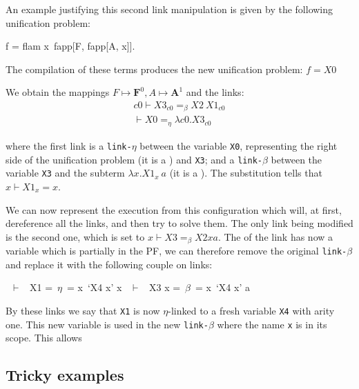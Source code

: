 \documentclass[sigconf,natbib=false,review]{acmart}
\newcommand{\linkbeta}{\texttt{link-}\ensuremath{\beta}\xspace}
\newcommand{\linketa}{\texttt{link-}\ensuremath{\eta}\xspace}
\newcommand{\linketaM}[3]{\ensuremath{#1 \vdash #2 =_\eta #3}}
\newcommand{\linkbetaM}[3]{\ensuremath{#1 \vdash #2 =_\beta #3}}
\newcommand{\substCell}[3]{\ensuremath{#1 \vdash #2 = #3}}
\newcommand{\mapping}[3]{\ensuremath{#1 \mapsto #2^#3}}
\begin{document}
An example justifying this second  link manipulation is given by the following
unification problem:

\def\varF{\ensuremath{\textbf{F}}\xspace}
\def\varA{\ensuremath{\textbf{A}}\xspace}
\def\varB{\ensuremath{\textbf{B}}\xspace}

\begin{elpicode}
  f = flam x\ fapp[F, fapp[A, x]].
\end{elpicode}


The compilation of these terms produces the new unification problem: $f = X0$

We obtain the mappings $\mapping{F}{\varF}{0}, \mapping{A}{\varA}{1}$ and the links:
%
\begin{gather}
  \linkbetaM{c0}{X3_{c0}}{X2~X1_{c0}}\\
  \linketaM{}{X0}{\lambda c0.X3_{c0}}
\end{gather}

\noindent
where the first link is a \linketa between the variable \texttt{X0}, representing
the right side of the unification problem (it is a \maybeeta) and
\texttt{X3}; and a \linkbeta between the variable \texttt{X3} and the subterm
$\lambda x.X1_x ~ a$ (it is a \maybebeta).
The substitution tells that \substCell{x}{X1_x}{x}.

We can now represent the \hrun execution from this configuration which will, at
first, dereference all the links, and then try to solve them. The only link
being modified is the second one, which is set to \linkbetaM{x}{X3}{X2 x a}. The
\rhs of the link has now a variable which is partially in the PF, we can
therefore remove the original \linkbeta and replace it with the following couple
on links:

\begin{textcode}
  ~$\vdash$~ X1   =~$\eta$~= x\ `X4 x'
x ~$\vdash$~ X3 x =~$\beta$~= x\ `X4 x' a
\end{textcode}

By these links we say that \texttt{X1} is now $\eta$-linked to a fresh variable
\texttt{X4} with arity one. This new variable is used in the new \linkbeta where
the name \texttt{x} is in its scope. This allows

\subsection{Tricky examples}
\end{document}
